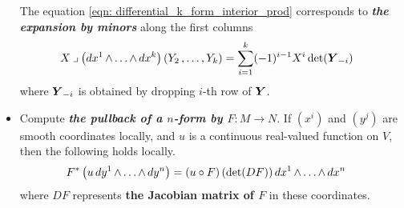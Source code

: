 \documentclass[11pt]{article}
\begin{document}
\begin{itemize}
The equation \eqref{eqn: differential_k_form_interior_prod} corresponds to \emph{\textbf{the expansion by minors}} along the first columns
\begin{align}
X \mathbin{\lrcorner }{\left(dx^{1} \,{\wedge}\ldots{\wedge}\, dx^{k}\right)}\left(Y_2 \,{,}\ldots{,}\, Y_k\right)&=  \sum_{i=1}^{k}(-1)^{i-1}X^i \det(\boldsymbol{Y}_{-i}) \label{eqn: differential_k_form_interior_prod_mat_expansion}
\end{align} where $\boldsymbol{Y}_{-i}$ is obtained by dropping $i$-th row of $\boldsymbol{Y}$.


\item Compute \emph{\textbf{the pullback of a $n$-form by $F: M \rightarrow N$}}. If $(x^i)$ and $(y^j)$ are smooth coordinates locally, and $u$ is a continuous real-valued function on $V$, then the following holds locally.
\begin{align*}
F^{*}\left(u\,dy^{1} \,{\wedge}\ldots{\wedge}\, dy^{n}\right) &= (u \circ F)\,(\det(DF))\,dx^{1} \,{\wedge}\ldots{\wedge}\, dx^{n}  
\end{align*}
where $DF$ represents \textbf{the Jacobian matrix of $F$} in these coordinates.
\end{itemize}
\end{document}
